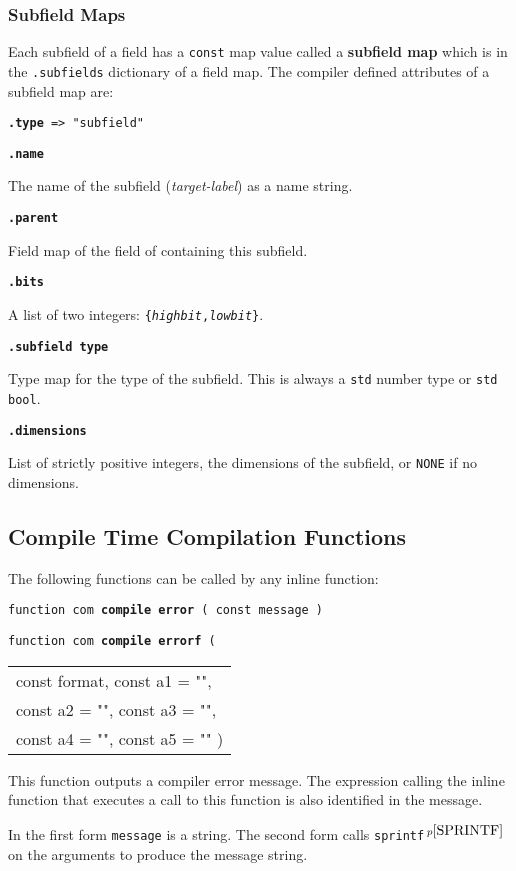 \documentclass[12pt]{article}
\newcommand{\key}[1]{{\rm \bfseries #1}}
\newcommand{\ttkey}[1]{{\tt \bfseries #1}}
\newcommand{\pagnote}[1]{$\,^{p\pageref{#1}}$}
\newenvironment{indpar}[1][0.3in]%
	{\begin{list}{}%
		     {\setlength{\itemsep}{0in}%
		      \setlength{\topsep}{0in}%
		      \setlength{\parsep}{1ex}%
		      \setlength{\labelwidth}{#1}%
		      \setlength{\leftmargin}{#1}%
		      \addtolength{\leftmargin}{\labelsep}}%
	 \item}%
	{\end{list}}
\begin{document}
\subsubsection{Subfield Maps}
\label{SUBFIELD-MAPS}

Each subfield of a field has a {\tt const} map value called
a \key{subfield map} which is in the {\tt .subfields} dictionary of
a field map.  The compiler defined attributes of a subfield map are:

{\tt \ttkey{.type} => "subfield"}

\ttkey{.name}
\begin{indpar}
The name of the subfield ({\em target-label})
as a name string.
\end{indpar}

\ttkey{.parent}
\begin{indpar}
Field map of the field of containing this subfield.
\end{indpar}

\ttkey{.bits}
\begin{indpar}
A list of two integers: {\tt \{{\rm \em highbit},{\rm \em lowbit}\}}.
\end{indpar}

\ttkey{.subfield type}
\begin{indpar}
Type map for the type of the subfield.
This is always a {\tt std} number type or {\tt std bool}.
\end{indpar}

\ttkey{.dimensions}
\begin{indpar}
List of strictly positive integers,
the dimensions of the subfield, or {\tt NONE} if no dimensions.
\end{indpar}

\subsection{Compile Time Compilation Functions}
\label{COMPILE-TIME-COMPILATION-FUNCTIONS}

The following functions can be called by any inline function:

{\tt function com \ttkey{compile error} ( const message )}%
	\label{COMPILE-ERROR} \\
{\tt function com \ttkey{compile errorf}
     ( \begin{tabular}[t]{@{}l}
	const format, const a1 = "", \\
	const a2 = "", const a3 = "", \\
	const a4 = "", const a5 = "" )
	\end{tabular} }
\begin{indpar}
This function outputs a compiler error message.  The expression calling
the inline function that executes a call to this function is also
identified in the message.

In the first form {\tt message} is a string.  The second form
calls {\tt sprintf}\pagnote{SPRINTF} on the arguments to produce
the message string.

\end{indpar}
\end{document}
